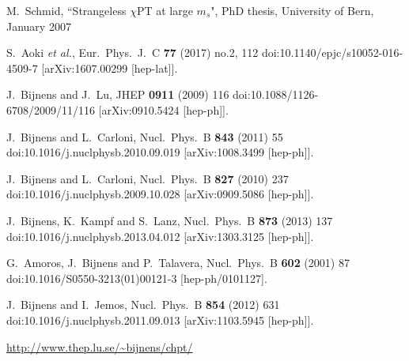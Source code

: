 \documentclass[12pt,a4paper]{article}
\begin{document}
\begin{thebibliography}{99}
  M.~Schmid, ``Strangeless $\chi$PT at large $m_s$", PhD thesis, University of Bern, January 2007
  
  S.~Aoki {\it et al.},
  Eur.\ Phys.\ J.\ C {\bf 77} (2017) no.2,  112
  doi:10.1140/epjc/s10052-016-4509-7
  [arXiv:1607.00299 [hep-lat]].


  J.~Bijnens and J.~Lu,
  JHEP {\bf 0911} (2009) 116
  doi:10.1088/1126-6708/2009/11/116
  [arXiv:0910.5424 [hep-ph]].

  J.~Bijnens and L.~Carloni,
  Nucl.\ Phys.\ B {\bf 843} (2011) 55
  doi:10.1016/j.nuclphysb.2010.09.019
  [arXiv:1008.3499 [hep-ph]].

  J.~Bijnens and L.~Carloni,
  Nucl.\ Phys.\ B {\bf 827} (2010) 237
  doi:10.1016/j.nuclphysb.2009.10.028
  [arXiv:0909.5086 [hep-ph]].

  J.~Bijnens, K.~Kampf and S.~Lanz,
  Nucl.\ Phys.\ B {\bf 873} (2013) 137
  doi:10.1016/j.nuclphysb.2013.04.012
  [arXiv:1303.3125 [hep-ph]].

  G.~Amoros, J.~Bijnens and P.~Talavera,
  Nucl.\ Phys.\ B {\bf 602} (2001) 87
  doi:10.1016/S0550-3213(01)00121-3
  [hep-ph/0101127].

  J.~Bijnens and I.~Jemos,
  Nucl.\ Phys.\ B {\bf 854} (2012) 631
  doi:10.1016/j.nuclphysb.2011.09.013
  [arXiv:1103.5945 [hep-ph]].

\href{http://www.thep.lu.se/~bijnens/chpt/}{http://www.thep.lu.se/\textasciitilde bijnens/chpt/}
  
  

\end{thebibliography}
\end{document}
